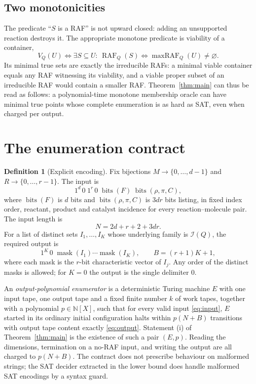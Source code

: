 \documentclass[11pt,a4paper]{article}
\theoremstyle{plain}
\theoremstyle{definition}
\newtheorem{definition}[theorem]{Definition}
\theoremstyle{remark}
\newcommand{\Irr}{\mathcal I}
\newcommand{\RAF}{\operatorname{RAF}}
\newcommand{\maxRAF}{\operatorname{maxRAF}}
\newcommand{\bits}{\operatorname{bits}}
\newcommand{\mask}{\operatorname{mask}}
\newcommand{\Nat}{\mathbb N}
\begin{document}
\subsection{Two monotonicities}

The predicate ``$S$ is a RAF'' is not upward closed: adding an unsupported reaction destroys it. The appropriate monotone predicate is viability of a container,
\[
 V_Q(U)\iff\exists S\subseteq U:\ \RAF_Q(S)\iff \maxRAF_Q(U)\neq\varnothing .
\]
Its minimal true sets are exactly the irreducible RAFs: a minimal viable container equals any RAF witnessing its viability, and a viable proper subset of an irreducible RAF would contain a smaller RAF. Theorem~\ref{thm:main} can thus be read as follows: a polynomial-time monotone membership oracle can have minimal true points whose complete enumeration is as hard as SAT, even when charged per output.

\section{The enumeration contract}\label{sec:contract}

\begin{definition}[Explicit encoding]\label{def:encoding}
Fix bijections $M\to\{0,\dots,d-1\}$ and $R\to\{0,\dots,r-1\}$. The input is
\begin{equation}\label{eq:input}
 1^d\,0\;1^r\,0\;\bits(F)\;\bits(\rho,\pi,C),
\end{equation}
where $\bits(F)$ is $d$ bits and $\bits(\rho,\pi,C)$ is $3dr$ bits listing, in fixed index order, reactant, product and catalyst incidence for every reaction--molecule pair. The input length is
\begin{equation}\label{eq:N}
 N=2d+r+2+3dr .
\end{equation}
For a list of distinct sets $I_1,\dots,I_K$ whose underlying family is $\Irr(Q)$, the required output is
\begin{equation}\label{eq:output}
 1^K\,0\;\mask(I_1)\cdots\mask(I_K),\qquad B=(r+1)K+1 ,
\end{equation}
where each mask is the $r$-bit characteristic vector of $I_j$. Any order of the distinct masks is allowed; for $K=0$ the output is the single delimiter $0$.
\end{definition}

An \emph{output-polynomial enumerator} is a deterministic Turing machine $E$ with one input tape, one output tape and a fixed finite number $k$ of work tapes, together with a polynomial $p\in\Nat[X]$, such that for every valid input \eqref{eq:input}, $E$ started in its ordinary initial configuration halts within $p(N+B)$ transitions with output tape content exactly \eqref{eq:output}. Statement (i) of Theorem~\ref{thm:main} is the existence of such a pair $(E,p)$. Reading the dimensions, termination on a no-RAF input, and writing the output are all charged to $p(N+B)$. The contract does not prescribe behaviour on malformed strings; the SAT decider extracted in the lower bound does handle malformed SAT encodings by a syntax guard.
\end{document}
